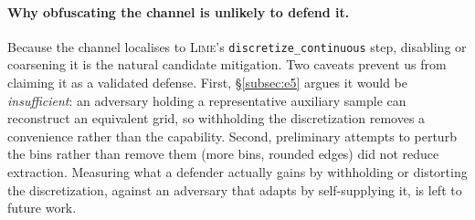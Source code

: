 \documentclass[sigconf,anonymous,review]{acmart}
\begin{document}
\paragraph{Why obfuscating the channel is unlikely to defend it.} Because the channel localises to \textsc{Lime}'s
\texttt{discretize\_continuous} step, disabling or coarsening it is the natural candidate mitigation.
Two caveats prevent us from claiming it as a validated defense. First, \S\ref{subsec:e5} argues it would be
\emph{insufficient}: an adversary holding a representative auxiliary sample can reconstruct an
equivalent grid, so withholding the discretization removes a convenience rather than the capability.
Second, preliminary attempts to perturb the bins rather than remove them (more bins, rounded edges)
did not reduce extraction. Measuring what a defender actually gains by withholding or distorting the
discretization, against an adversary that adapts by self-supplying it, is left to future work.
\end{document}
